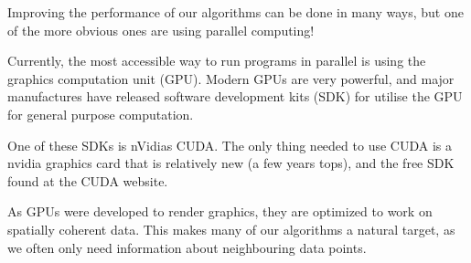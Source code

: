 
Improving the performance of our algorithms can be done in many ways,
but one of the more obvious ones are using parallel computing!

Currently, the most accessible way to run programs in parallel is
using the graphics computation unit (GPU). Modern GPUs are very
powerful, and major manufactures have released software development
kits (SDK) for utilise the GPU for general purpose computation.

One of these SDKs is nVidias CUDA. The only thing needed to
use CUDA is a nvidia graphics card that is relatively new (a few years
tops), and the free SDK found at the CUDA website.

As GPUs were developed to render graphics, they are optimized to work
on spatially coherent data. This makes many of our algorithms a
natural target, as we often only need information about neighbouring
data points.


